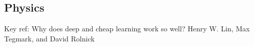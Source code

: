 \documentclass[english]{article}
\begin{document}
%
%
%
%
%
%
%
%




%
%
%
%
%
%
%
%
%
%
%
%


\subsection{Physics}


\benum
\item Key ref: Why does deep and cheap learning work so well? Henry W. Lin, Max Tegmark, and David Rolnick
\end{document}
